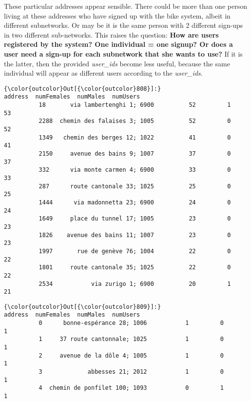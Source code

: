 \documentclass{report}
\begin{document}
    These particular addresses appear sensible. There could be more than one
person living at these addresses who have signed up with the bike
system, albeit in different subnetworks. Or may be it is the same person
with 2 different sign-ups in two different sub-networks. This raises the
question: \textbf{How are users registered by the system? One individual
= one signup? Or does a user need a sign-up for each subnetwork that she
wants to use?} If it is the latter, then the provided \emph{user\_ids}
become less useful, because the same individual will appear as different
users according to the \emph{user\_ids}.


            \begin{Verbatim}[commandchars=\\\{\}]
{\color{outcolor}Out[{\color{outcolor}808}]:}                           address  numFemales  numMales  numUsers
          18       via lambertenghi 1; 6900          52         1        53
          2288  chemin des falaises 3; 1005          52         0        52
          1349   chemin des berges 12; 1022          41         0        41
          2150     avenue des bains 9; 1007          37         0        37
          332      via monte carmen 4; 6900          33         0        33
          287      route cantonale 33; 1025          25         0        25
          1444      via madonnetta 23; 6900          24         0        24
          1649     place du tunnel 17; 1005          23         0        23
          1826    avenue des bains 11; 1007          23         0        23
          1997       rue de genève 76; 1004          22         0        22
          1801     route cantonale 35; 1025          22         0        22
          2534           via zurigo 1; 6900          20         1        21
\end{Verbatim}
        

            \begin{Verbatim}[commandchars=\\\{\}]
{\color{outcolor}Out[{\color{outcolor}809}]:}                         address  numFemales  numMales  numUsers
          0      bonne-espérance 28; 1006           1         0         1
          1     37 route cantonnale; 1025           1         0         1
          2     avenue de la dôle 4; 1005           1         0         1
          3             abbesses 21; 2012           1         0         1
          4  chemin de ponfilet 100; 1093           0         1         1
\end{Verbatim}
        

    
    
    
    
\end{document}
